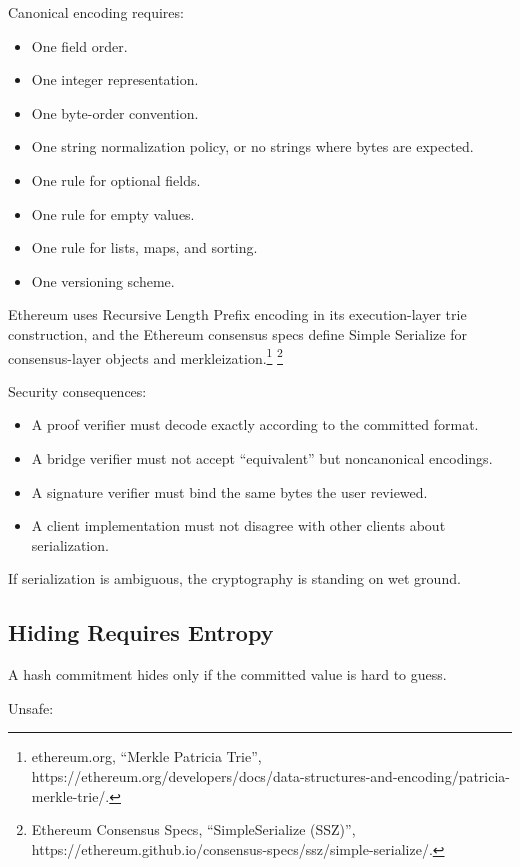Canonical encoding requires:

\begin{itemize}
\tightlist
\item
  One field order.
\item
  One integer representation.
\item
  One byte-order convention.
\item
  One string normalization policy, or no strings where bytes are
  expected.
\item
  One rule for optional fields.
\item
  One rule for empty values.
\item
  One rule for lists, maps, and sorting.
\item
  One versioning scheme.
\end{itemize}

Ethereum uses Recursive Length Prefix encoding in its execution-layer
trie construction, and the Ethereum consensus specs define Simple
Serialize for consensus-layer objects and merkleization.\footnote{ethereum.org,
  ``Merkle Patricia Trie'',
  https://ethereum.org/developers/docs/data-structures-and-encoding/patricia-merkle-trie/.}
\footnote{Ethereum Consensus Specs, ``SimpleSerialize (SSZ)'',
  https://ethereum.github.io/consensus-specs/ssz/simple-serialize/.}

Security consequences:

\begin{itemize}
\tightlist
\item
  A proof verifier must decode exactly according to the committed
  format.
\item
  A bridge verifier must not accept ``equivalent'' but noncanonical
  encodings.
\item
  A signature verifier must bind the same bytes the user reviewed.
\item
  A client implementation must not disagree with other clients about
  serialization.
\end{itemize}

If serialization is ambiguous, the cryptography is standing on wet
ground.

\subsection{Hiding Requires Entropy}

A hash commitment hides only if the committed value is hard to guess.

Unsafe:

